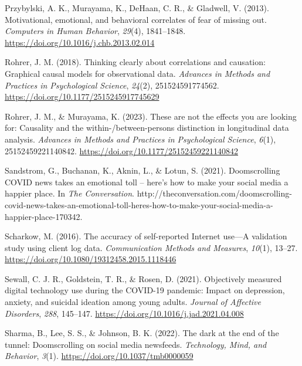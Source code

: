 \documentclass[
  man,mask,floatsintext]{apa7}
\newlength{\cslhangindent}
\newenvironment{CSLReferences}[2] %
 {\begin{list}{}{%
  \setlength{\itemindent}{0pt}
  \setlength{\leftmargin}{0pt}
  \setlength{\parsep}{0pt}
  \ifodd #1
   \setlength{\leftmargin}{\cslhangindent}
   \setlength{\itemindent}{-1\cslhangindent}
  \fi
  \setlength{\itemsep}{#2\baselineskip}}}
 {\end{list}}
\begin{document}
\begin{CSLReferences}{1}{0}
Przybylski, A. K., Murayama, K., DeHaan, C. R., \& Gladwell, V. (2013). Motivational, emotional, and behavioral correlates of fear of missing out. \emph{Computers in Human Behavior}, \emph{29}(4), 1841--1848. \url{https://doi.org/10.1016/j.chb.2013.02.014}

Rohrer, J. M. (2018). Thinking clearly about correlations and causation: {Graphical} causal models for observational data. \emph{Advances in Methods and Practices in Psychological Science}, \emph{24}(2), 251524591774562. \url{https://doi.org/10.1177/2515245917745629}

Rohrer, J. M., \& Murayama, K. (2023). These are not the effects you are looking for: {Causality} and the within-/between-persons distinction in longitudinal data analysis. \emph{Advances in Methods and Practices in Psychological Science}, \emph{6}(1), 25152459221140842. \url{https://doi.org/10.1177/25152459221140842}

Sandstrom, G., Buchanan, K., Aknin, L., \& Lotun, S. (2021). Doomscrolling {COVID} news takes an emotional toll -- here's how to make your social media a happier place. In \emph{The Conversation}. http://theconversation.com/doomscrolling-covid-news-takes-an-emotional-toll-heres-how-to-make-your-social-media-a-happier-place-170342.

Scharkow, M. (2016). The accuracy of self-reported {Internet} use---{A} validation study using client log data. \emph{Communication Methods and Measures}, \emph{10}(1), 13--27. \url{https://doi.org/10.1080/19312458.2015.1118446}

Sewall, C. J. R., Goldstein, T. R., \& Rosen, D. (2021). Objectively measured digital technology use during the {COVID-19} pandemic: {Impact} on depression, anxiety, and suicidal ideation among young adults. \emph{Journal of Affective Disorders}, \emph{288}, 145--147. \url{https://doi.org/10.1016/j.jad.2021.04.008}

Sharma, B., Lee, S. S., \& Johnson, B. K. (2022). The dark at the end of the tunnel: {Doomscrolling} on social media newsfeeds. \emph{Technology, Mind, and Behavior}, \emph{3}(1). \url{https://doi.org/10.1037/tmb0000059}


\end{CSLReferences}
\end{document}
